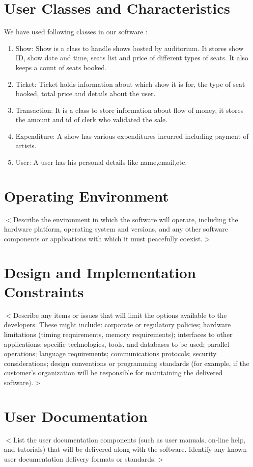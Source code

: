 \documentclass{scrreprt}
\begin{document}
\section{User Classes and Characteristics}
We have used following classes in our software :
\begin{enumerate}
	\item Show: Show is a class to handle shows hosted by auditorium. It stores show ID, show
date and time, seats list and price of different types of seats. It also keeps a count of seats booked.
	\item Ticket: Ticket holds information about which show it is for, the type of seat booked, total price and details about the user.
	\item Transaction: It is a class to store information about flow of money, it stores the amount and id of clerk who validated the sale.
	\item Expenditure: A show has various expenditures incurred including payment of artists.
	\item User: A user has his personal details like name,email,etc.
\end{enumerate}


\section{Operating Environment}
$<$Describe the environment in which the software will operate, including the 
hardware platform, operating system and versions, and any other software 
components or applications with which it must peacefully coexist.$>$

\section{Design and Implementation Constraints}
$<$Describe any items or issues that will limit the options available to the 
developers. These might include: corporate or regulatory policies; hardware 
limitations (timing requirements, memory requirements); interfaces to other 
applications; specific technologies, tools, and databases to be used; parallel 
operations; language requirements; communications protocols; security 
considerations; design conventions or programming standards (for example, if the 
customer’s organization will be responsible for maintaining the delivered 
software).$>$

\section{User Documentation}
$<$List the user documentation components (such as user manuals, on-line help, 
and tutorials) that will be delivered along with the software. Identify any 
known user documentation delivery formats or standards.$>$
\end{document}
